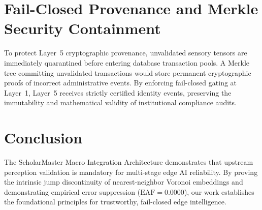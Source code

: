 \documentclass[10pt,journal,compsoc]{IEEEtran}
\begin{document}
\section{Fail-Closed Provenance and Merkle Security Containment}
To protect Layer~5 cryptographic provenance, unvalidated sensory tensors are immediately quarantined before entering database transaction pools. A Merkle tree committing unvalidated transactions would store permanent cryptographic proofs of incorrect administrative events. By enforcing fail-closed gating at Layer~1, Layer~5 receives strictly certified identity events, preserving the immutability and mathematical validity of institutional compliance audits.

\section{Conclusion}
The ScholarMaster Macro Integration Architecture demonstrates that upstream perception validation is mandatory for multi-stage edge AI reliability. By proving the intrinsic jump discontinuity of nearest-neighbor Voronoi embeddings and demonstrating empirical error suppression ($\text{EAF} = 0.0000$), our work establishes the foundational principles for trustworthy, fail-closed edge intelligence.
\end{document}
